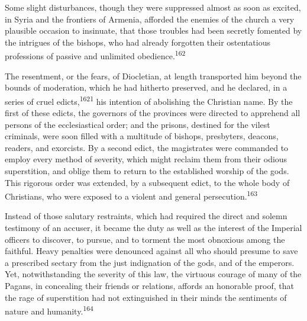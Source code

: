 
Some slight disturbances, though they were suppressed almost as
soon as excited, in Syria and the frontiers of Armenia, afforded
the enemies of the church a very plausible occasion to insinuate,
that those troubles had been secretly fomented by the intrigues
of the bishops, who had already forgotten their ostentatious
professions of passive and unlimited obedience.\textsuperscript{162}

The resentment, or the fears, of Diocletian, at length
transported him beyond the bounds of moderation, which he had
hitherto preserved, and he declared, in a series of cruel edicts,\textsuperscript{1621}
his intention of abolishing the Christian name. By the first
of these edicts, the governors of the provinces were directed to
apprehend all persons of the ecclesiastical order; and the
prisons, destined for the vilest criminals, were soon filled with
a multitude of bishops, presbyters, deacons, readers, and
exorcists. By a second edict, the magistrates were commanded to
employ every method of severity, which might reclaim them from
their odious superstition, and oblige them to return to the
established worship of the gods. This rigorous order was
extended, by a subsequent edict, to the whole body of Christians,
who were exposed to a violent and general persecution.\textsuperscript{163}

Instead of those salutary restraints, which had required the
direct and solemn testimony of an accuser, it became the duty as
well as the interest of the Imperial officers to discover, to
pursue, and to torment the most obnoxious among the faithful.
Heavy penalties were denounced against all who should presume to
save a prescribed sectary from the just indignation of the gods,
and of the emperors. Yet, notwithstanding the severity of this
law, the virtuous courage of many of the Pagans, in concealing
their friends or relations, affords an honorable proof, that the
rage of superstition had not extinguished in their minds the
sentiments of nature and humanity.\textsuperscript{164}

